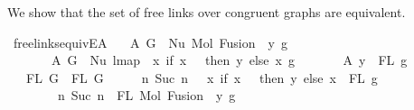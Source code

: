 \begin{isabellebody}
\isamarkupfalse%
%
\endisatagproof
{\isafoldproof}%
%
\isadelimproof
%
\endisadelimproof
%
\isadelimdocument
%
\endisadelimdocument
%
\isatagdocument
%
\isamarkuptrue%
%
\isamarkuptrue%
%
\endisatagdocument
{\isafolddocument}%
%
\isadelimdocument
%
\endisadelimdocument
%
\begin{isamarkuptext}%
We show that the set of free links over congruent graphs are equivalent.%
\end{isamarkuptext}\isamarkuptrue%
\isamarkupfalse%
\ freelinks{\isacharunderscore}{\kern0pt}equiv{\isacharunderscore}{\kern0pt}E{}A{\isacharcolon}{\kern0pt}\isanewline
\ \ \ A{}{\isacharcolon}{\kern0pt}\ {\isachardoublequoteopen}G{}\ {\isacharequal}{\kern0pt}\ Nu\ {\isacharparenleft}{\kern0pt}Mol\ {\isacharparenleft}{\kern0pt}Fusion\ {}\ y{\isacharparenright}{\kern0pt}\ g{\isacharparenright}{\kern0pt}{\isachardoublequoteclose}\isanewline
\ \ \ \ \ \ \ A{}{\isacharcolon}{\kern0pt}\ {\isachardoublequoteopen}G{}\ {\isacharequal}{\kern0pt}\ Nu\ {\isacharparenleft}{\kern0pt}lmap\ {\isacharparenleft}{\kern0pt}{\isasymlambda}\ x{\isachardot}{\kern0pt}\ if\ x\ {\isacharequal}{\kern0pt}\ {}\ then\ y\ else\ x{\isacharparenright}{\kern0pt}\ g{\isacharparenright}{\kern0pt}{\isachardoublequoteclose}\isanewline
\ \ \ \ \ \ \ A{}{\isacharcolon}{\kern0pt}\ {\isachardoublequoteopen}y\ {\isasymin}\ FL\ g{\isachardoublequoteclose}\isanewline
\ \ \ {\isachardoublequoteopen}FL\ G{}\ {\isacharequal}{\kern0pt}\ FL\ G{}{\isachardoublequoteclose}\isanewline
%
\isadelimproof
%
\endisadelimproof
%
\isatagproof
{}\isamarkupfalse%
\ {\isacharminus}{\kern0pt}\isanewline
\ \ \isamarkupfalse%
\ {\isachardoublequoteopen}{\isacharbraceleft}{\kern0pt}n{\isachardot}{\kern0pt}\ Suc\ n\ {\isasymin}\ {\isacharparenleft}{\kern0pt}{\isasymlambda}\ x{\isachardot}{\kern0pt}\ if\ x\ {\isacharequal}{\kern0pt}\ {}\ then\ y\ else\ x{\isacharparenright}{\kern0pt}\ {\isacharbackquote}{\kern0pt}\ FL\ g{\isacharbraceright}{\kern0pt}\ {\isacharequal}{\kern0pt}\isanewline
\ \ \ \ \ \ \ \ {\isacharbraceleft}{\kern0pt}n{\isachardot}{\kern0pt}\ Suc\ n\ {\isasymin}\ FL\ {\isacharparenleft}{\kern0pt}Mol\ {\isacharparenleft}{\kern0pt}Fusion\ {}\ y{\isacharparenright}{\kern0pt}\ g{\isacharparenright}{\kern0pt}{\isacharbraceright}{\kern0pt}{\isachardoublequoteclose}\isanewline

\end{isabellebody}
